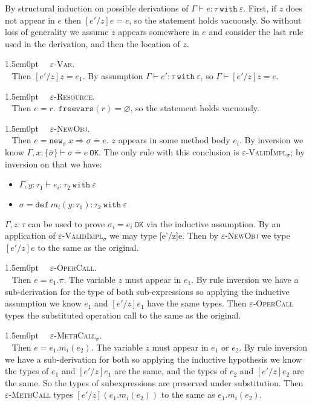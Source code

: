 \documentclass{llncs}
\newcommand{\keywadj}[1]{\mathtt{#1}}
\newcommand{\keyw}[1]{\keywadj{#1}~}
\newcommand{\proofcase}[2]{
	\begin{adjustwidth}{1.5em}{0pt}
		\fbox{Case.}~~#1. \\ ~#2
	\end{adjustwidth}
}
\newcommand{\newsig}[0]{
	\keywadj{new}_\sigma~x \Rightarrow \overline{\sigma = e}
}
\begin{document}
{By structural induction on possible derivations of $\Gamma \vdash e : \tau~\keyw{with} \varepsilon$. First, if $z$ does not appear in $e$ then $[e'/z]e = e$, so the statement holds vacuously. So without loss of generality we assume $z$ appears somewhere in $e$ and consider the last rule used in the derivation, and then the location of $z$. \\

	\proofcase{\textsc{$\varepsilon$-Var}} {
		Then $[e'/z]z = e_1$. By assumption $\Gamma \vdash e' : \tau~\keyw{with} \varepsilon$, so $\Gamma \vdash [e'/z]z = e$. \\
	}
		
	\proofcase{\textsc{$\varepsilon$-Resource}} {
		Then $e = r$. $\keywadj{freevars}(r) = \varnothing$, so the statement holds vacuously.\\
	}
		
	\proofcase{\textsc{$\varepsilon$-NewObj}} {
		Then $e = \newsig$. $z$ appears in some method body $e_i$. By inversion we know $\Gamma, x : \{ \bar \sigma \} \vdash \overline {\sigma = e}~\keywadj{OK}$. The only rule with this conclusion is \textsc{$\varepsilon$-ValidImpl$_\sigma$}; by inversion on that we have:
		 \begin{itemize}
		 	\item $\Gamma, y : \tau_1 \vdash e_i : \tau_2~\keyw{with} \varepsilon$
		 	\item $\sigma = \keyw{def} m_i(y : \tau_1) : \tau_2~\keyw{with} \varepsilon$
		\end{itemize}
	$\Gamma, z : \tau$ can be used to prove $\sigma_i = e_i~\keywadj{OK}$ via the inductive assumption. By an application of \textsc{$\varepsilon$-ValidImpl$_\sigma$} we may type [e'/z]e. Then by \textsc{$\varepsilon$-NewObj} we type $[e'/z]e$ to the same as the original.\\
	}
	
	\proofcase{\textsc{$\varepsilon$-OperCall}} {
		Then $e = e_1.\pi$. The variable $z$ must appear in $e_1$. By rule inversion we have a sub-derivation for the type of both sub-expressions so applying the inductive assumption we know $e_1$ and $[e'/z]e_1$ have the same types. Then \textsc{$\varepsilon$-OperCall} types the substituted operation call to the same as the original. \\
	}

	\proofcase{\textsc{$\varepsilon$-MethCall$_\sigma$}} {
		Then $e =e _1.m_i(e_2)$. The variable $z$ must appear in $e_1$ or $e_2$. By rule inversion we have a sub-derivation for both so applying the inductive hypothesis we know the types of $e_1$ and $[e'/z]e_1$ are the same, and the types of $e_2$ and $[e'/z]e_2$ are the same. So the types of subexpressions are preserved under substitution. Then \textsc{$\varepsilon$-MethCall} types $[e'/z](e_1.m_i(e_2))$ to the same as $e_1.m_i(e_2)$.
	}
}
\end{document}
